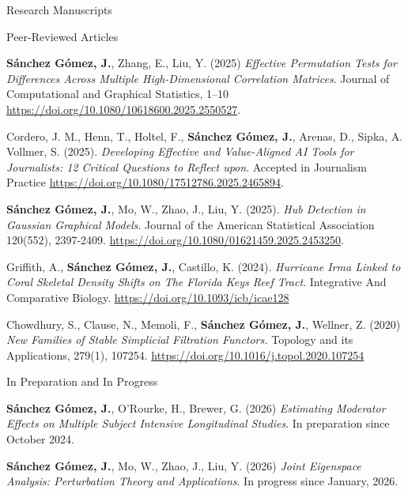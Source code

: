 \documentclass{resume_customized} %
\begin{document}
\begin{rSection}{Research Manuscripts}
       
    \begin{rSubsection}{Peer-Reviewed Articles}{}{}
	
	
	\item {\bf Sánchez Gómez, J.}, Zhang, E., Liu, Y. (2025) \textit{Effective Permutation Tests for Differences Across Multiple High-Dimensional Correlation Matrices}. Journal of Computational and Graphical Statistics, 1–10 \url{https://doi.org/10.1080/10618600.2025.2550527}.

	\item Cordero, J. M., Henn, T., Holtel, F., {\bf Sánchez Gómez, J.}, Arenas, D., Sipka, A. Vollmer, S. (2025). \textit{Developing Effective and Value-Aligned AI Tools for Journalists: 12 Critical Questions to Reflect upon}. Accepted in Journalism Practice \url{https://doi.org/10.1080/17512786.2025.2465894}.

	\item {\bf Sánchez Gómez, J.}, Mo, W., Zhao, J., Liu, Y. (2025). \textit{Hub Detection in Gaussian Graphical Models}. Journal of the American Statistical Association 120(552), 2397-2409. \url{https://doi.org/10.1080/01621459.2025.2453250}.
 

	\item Griffith, A., \textbf{ Sánchez Gómez, J.}, Castillo, K. (2024). \textit{Hurricane Irma Linked to Coral Skeletal Density Shifts on The Florida Keys Reef Tract}.  Integrative And Comparative Biology. \url{https://doi.org/10.1093/icb/icae128}
	
	
	\item Chowdhury, S., Clause, N., Memoli, F., {\bf Sánchez Gómez, J.}, Wellner, Z. (2020) {\it New Families of Stable Simplicial Filtration Functors.} Topology and its Applications, 279(1), 107254. \url{https://doi.org/10.1016/j.topol.2020.107254}
	
    \end{rSubsection}
    
    \begin{rSubsection}{In Preparation and In Progress}{}{}
    			
		\item {\bf Sánchez Gómez, J.}, O'Rourke, H., Brewer, G. (2026) {\it Estimating Moderator Effects on Multiple Subject Intensive Longitudinal Studies}. In preparation since October 2024.    	
		
    	\item {\bf Sánchez Gómez, J.}, Mo, W., Zhao, J., Liu, Y. (2026) {\it Joint Eigenspace Analysis: Perturbation Theory and Applications}. In progress since January, 2026.
    	

\end{rSubsection}
\end{rSection}
\end{document}
